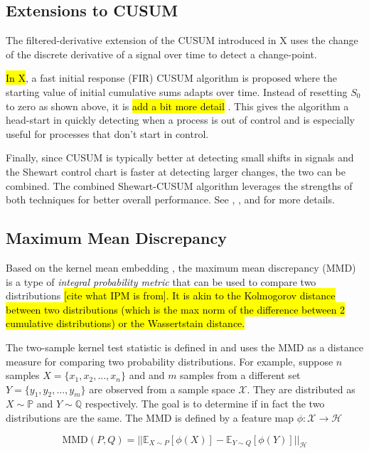 \subsection{Extensions to CUSUM}
The filtered-derivative extension of the CUSUM introduced in X uses the change of the discrete derivative of a signal over time to detect a change-point. 

\hl{In X}, a fast initial response (FIR) CUSUM algorithm is proposed where the starting value of initial cumulative sums adapts over time. Instead of resetting $S_0$ to zero as shown above, it is \hl{add a bit more detail} . This gives the algorithm a head-start in quickly detecting when a process is out of control and is especially useful for processes that don't start in control.

Finally, since CUSUM is typically better at detecting small shifts in signals and the Shewart control chart is faster at detecting larger changes, the two can be combined. The combined Shewart-CUSUM algorithm leverages the strengths of both techniques for better overall performance. See \cite{lucas1982combined}, \cite{yashchin1985analysis}, and \cite{westgard1977combined} for more details. 

\subsection{Maximum Mean Discrepancy}
Based on the kernel mean embedding , the maximum mean discrepancy (MMD) is a type of \textit{integral probability metric} that can be used to compare two distributions \hl{[cite what IPM is from]. It is akin to the Kolmogorov distance between two distributions (which is the max norm of the difference between 2 cumulative distributions) or the Wassertstain distance.}

The two-sample kernel test statistic is defined in \cite{gretton2012kernel} and uses the MMD as a distance measure for comparing two probability distributions. For example, suppose $n$ samples $X = \{x_1, x_2, ..., x_n\}$ and and $m$ samples from a different set $Y=\{y_1, y_2, ..., y_m\}$ are observed from a sample space $\mathcal{X}$. They are distributed as $X \sim  \mathbb{P}$ and $Y \sim \mathbb{Q}$ respectively. The goal is to determine if in fact the two distributions are the same. The MMD is defined by a feature map $\phi: \mathcal{X} \rightarrow \mathcal{H}$

$$\text{MMD}(P,Q)=|| \mathbb{E}_{X \sim P}[\phi(X)] -  \mathbb{E}_{Y \sim Q}[\phi(Y)]||_\mathcal{H}$$

